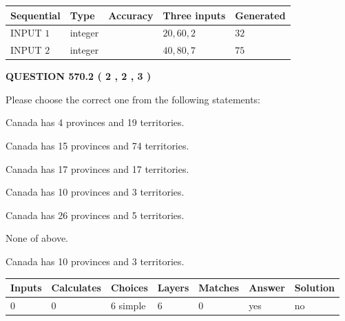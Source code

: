 \documentclass[12pt]{article}
\begin{document}
  
\noindent\begin{tabular}{|l|l|l|l|l|}
\hline
 Sequential & Type & Accuracy & Three inputs & Generated \\ 
\hline
 
 
  INPUT $  1 $ & integer &  & $
 20
 , 
 60
 , 
 2
 $ & $ 32 $ 
 \\  \hline  
 
 
  INPUT $  2 $ & integer &  & $
 40
 , 
 80
 , 
 7
 $ & $ 75 $ 
 \\  \hline  
 \end{tabular}
   
   
  
\vspace{0.2in}
  
{\textbf{\Large{QUESTION
570.2 
 ( 2 , 2 , 3 )
}}}
  
  
Please choose the correct one from the following statements:
 
 
Canada has   4 provinces and  19 territories.
 
 
Canada has  15 provinces and  74 territories.
 
 
Canada has  17 provinces and  17 territories.
 
 
Canada has 10  provinces and 3 territories.
 
 
Canada has  26 provinces and  5 territories.
 
 
 None of above.
 
 
\noindent{}
 
 
Canada has 10  provinces and 3 territories.
 
 
\noindent{}
 
 
   
   
   
   
\noindent\begin{tabular}{|l|l|l|l|l|l|l|}
 \hline
Inputs & Calculates & Choices & Layers & Matches & Answer & Solution \\ \hline
 0  & 
 0  & 
 6
  simple  
  & 
 6  & 
 0  & 
  yes & 
  no 
  \\ \hline
 \end{tabular}
   
\end{document}
